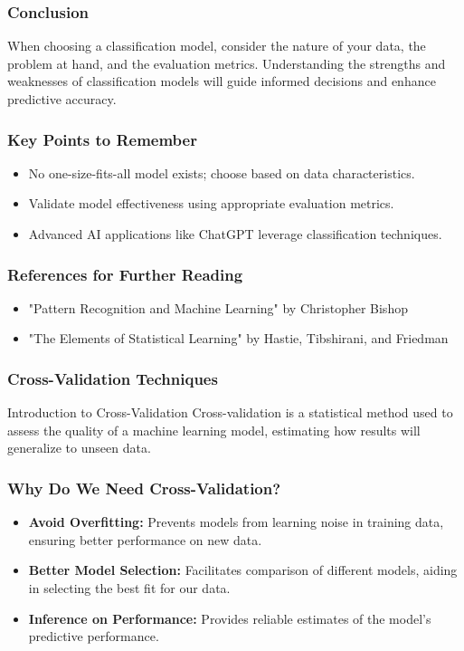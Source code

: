 \documentclass[aspectratio=169]{beamer}
\begin{document}
\begin{frame}[fragile]
    \frametitle{Conclusion}
    When choosing a classification model, consider the nature of your data, the problem at hand, and the evaluation metrics. 
    Understanding the strengths and weaknesses of classification models will guide informed decisions and enhance predictive accuracy.
\end{frame}

\begin{frame}[fragile]
    \frametitle{Key Points to Remember}
    \begin{itemize}
        \item No one-size-fits-all model exists; choose based on data characteristics.
        \item Validate model effectiveness using appropriate evaluation metrics.
        \item Advanced AI applications like ChatGPT leverage classification techniques.
    \end{itemize}
\end{frame}

\begin{frame}[fragile]
    \frametitle{References for Further Reading}
    \begin{itemize}
        \item "Pattern Recognition and Machine Learning" by Christopher Bishop
        \item "The Elements of Statistical Learning" by Hastie, Tibshirani, and Friedman
    \end{itemize}
\end{frame}

\begin{frame}[fragile]
    \frametitle{Cross-Validation Techniques}
    \begin{block}{Introduction to Cross-Validation}
        Cross-validation is a statistical method used to assess the quality of a machine learning model, estimating how results will generalize to unseen data. 
    \end{block}
\end{frame}

\begin{frame}[fragile]
    \frametitle{Why Do We Need Cross-Validation?}
    \begin{itemize}
        \item \textbf{Avoid Overfitting:} Prevents models from learning noise in training data, ensuring better performance on new data.
        \item \textbf{Better Model Selection:} Facilitates comparison of different models, aiding in selecting the best fit for our data.
        \item \textbf{Inference on Performance:} Provides reliable estimates of the model's predictive performance.
    \end{itemize}
\end{frame}
\end{document}
